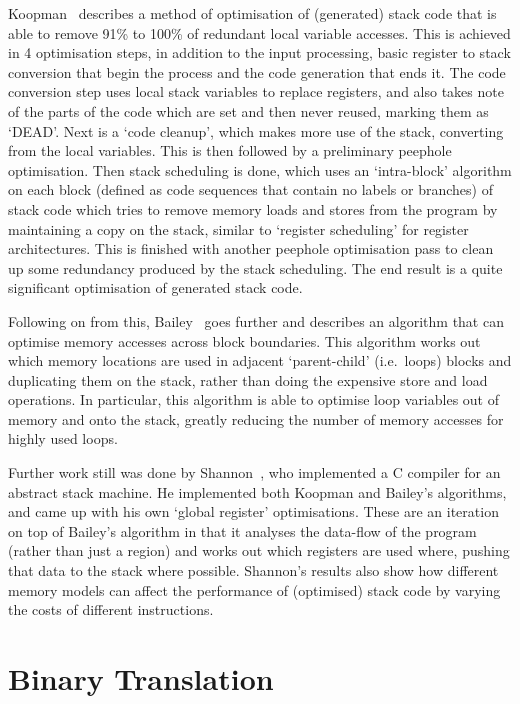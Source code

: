 Koopman~\cite{Koopman1995Preliminary} describes a method of optimisation of
(generated) stack code that is able to remove 91\% to 100\% of redundant local
variable accesses. This is achieved in 4 optimisation steps, in addition to the
input processing, basic register to stack conversion that begin the process and
the code generation that ends it. The code conversion step uses local stack
variables to replace registers, and also takes note of the parts of the code
which are set and then never reused, marking them as `DEAD'.  Next is a `code
cleanup', which makes more use of the stack, converting from the local
variables. This is then followed by a preliminary peephole optimisation. Then
stack scheduling is done, which uses an `intra-block' algorithm on each block
(defined as code sequences that contain no labels or branches) of stack code
which tries to remove memory loads and stores from the program by maintaining a
copy on the stack, similar to `register scheduling' for register architectures.
This is finished with another peephole optimisation pass to clean up some
redundancy produced by the stack scheduling. The end result is a quite
significant optimisation of generated stack code.

Following on from this, Bailey~\cite{Bailey2000Inter} goes further and describes
an algorithm that can optimise memory accesses across block boundaries. This
algorithm works out which memory locations are used in adjacent `parent-child'
(i.e.\ loops) blocks and duplicating them on the stack, rather than doing the
expensive store and load operations. In particular, this algorithm is able to
optimise loop variables out of memory and onto the stack, greatly reducing the
number of memory accesses for highly used loops.

Further work still was done by Shannon~\cite{Shannon2006AC}, who implemented a C
compiler for an abstract stack machine. He implemented both Koopman and Bailey's
algorithms, and came up with his own `global register' optimisations. These are
an iteration on top of Bailey's algorithm in that it analyses the data-flow of
the program (rather than just a region) and works out which registers are used
where, pushing that data to the stack where possible. Shannon's results also
show how different memory models can affect the performance of (optimised) stack
code by varying the costs of different instructions.

\section{Binary Translation}

